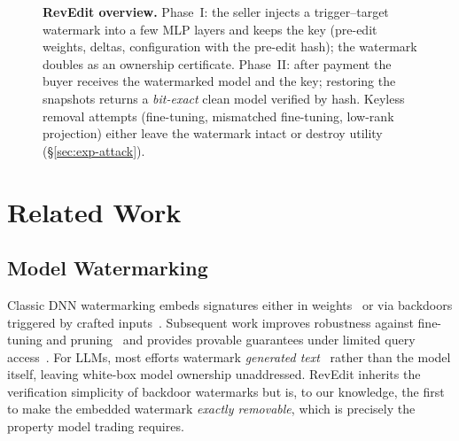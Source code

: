 \documentclass[conference,10pt]{IEEEtran}
\begin{document}
\begin{figure}[t]
{%
}%
\caption{\textbf{RevEdit overview.} Phase~I: the seller injects a
trigger--target watermark into a few MLP layers and keeps the key (pre-edit
weights, deltas, configuration with the pre-edit hash); the watermark doubles
as an ownership certificate. Phase~II: after payment the buyer receives the
watermarked model and the key; restoring the snapshots returns a
\emph{bit-exact} clean model verified by hash. Keyless removal attempts
(fine-tuning, mismatched fine-tuning, low-rank projection) either leave the
watermark intact or destroy utility (\S\ref{sec:exp-attack}).}
\label{fig:framework}
\end{figure}

\section{Related Work}
\subsection{Model Watermarking}
Classic DNN watermarking embeds signatures either in weights~\cite{uchida}
or via backdoors triggered by crafted inputs~\cite{adi}. Subsequent work
improves robustness against fine-tuning and pruning~\cite{riga} and
provides provable guarantees under limited query access~\cite{zhao}. For
LLMs, most efforts watermark \emph{generated text}~\cite{kirchenbauer}
rather than the model itself, leaving white-box model ownership unaddressed.
RevEdit inherits the verification simplicity of backdoor watermarks but is,
to our knowledge, the first to make the embedded watermark \emph{exactly
removable}, which is precisely the property model trading requires.
\end{document}
